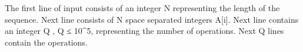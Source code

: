 The first line of input consists of an integer N representing the length of the sequence. Next line consists of N space separated integers A[i]. Next line contains an integer Q , Q ≤ 10^5, representing the number of operations. Next Q lines contain the operations.

\